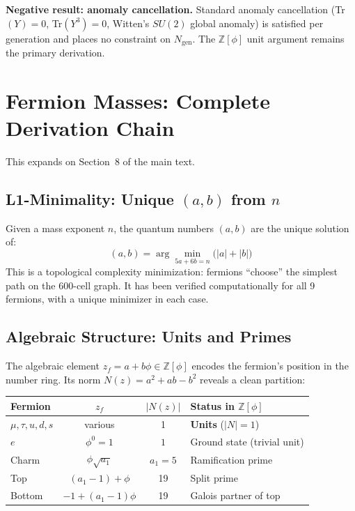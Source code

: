 \documentclass[12pt,a4paper]{article}
\theoremstyle{definition}
\begin{document}
\textbf{Negative result: anomaly cancellation.}  Standard anomaly cancellation (Tr$(Y) = 0$, Tr$(Y^3) = 0$, Witten's $SU(2)$ global anomaly) is satisfied per generation and places no constraint on $N_{\text{gen}}$.  The $\mathbb{Z}[\phi]$ unit argument remains the primary derivation.


\section{Fermion Masses: Complete Derivation Chain}
\label{sec:S-masses}

This expands on Section~8 of the main text.

\subsection{L1-Minimality: Unique \texorpdfstring{$(a,b)$}{(a,b)} from \texorpdfstring{$n$}{n}}

Given a mass exponent $n$, the quantum numbers $(a,b)$ are the unique solution of:
\begin{equation}
(a,b) = \arg\min_{5a + 6b = n} \bigl(|a| + |b|\bigr)
\end{equation}
This is a topological complexity minimization: fermions ``choose'' the simplest path on the 600-cell graph. It has been verified computationally for all 9 fermions, with a unique minimizer in each case.

\subsection{Algebraic Structure: Units and Primes}

The algebraic element $z_f = a + b\phi \in \mathbb{Z}[\phi]$ encodes the fermion's position in the number ring. Its norm $N(z) = a^2 + ab - b^2$ reveals a clean partition:

\begin{center}
\begin{tabular}{lccl}
\toprule
\textbf{Fermion} & $z_f$ & $|N(z)|$ & \textbf{Status in $\mathbb{Z}[\phi]$} \\
\midrule
$\mu, \tau, u, d, s$ & various & 1 & \textbf{Units} ($|N| = 1$) \\
$e$ & $\phi^0 = 1$ & $1$ & Ground state (trivial unit) \\
Charm & $\phi\sqrt{a_1}$ & $a_1 = 5$ & Ramification prime \\
Top & $(a_1-1) + \phi$ & 19 & Split prime \\
Bottom & $-1 + (a_1-1)\phi$ & 19 & Galois partner of top \\
\bottomrule
\end{tabular}
\end{center}
\end{document}
